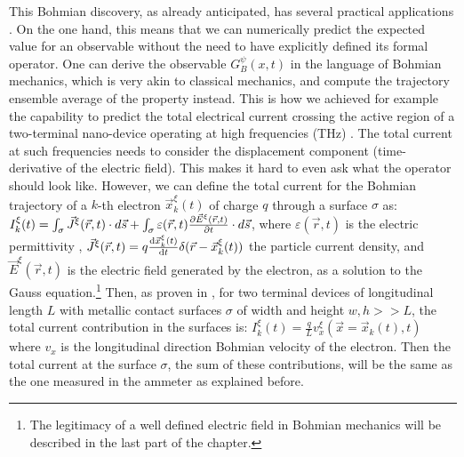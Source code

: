 \documentclass[11pt, a4paper]{article} %
\begin{document}
This Bohmian discovery, as already anticipated, has several practical applications \cite{DevInPosition1, DevInPosition2}. On the one hand, this means that we can numerically predict the expected value for an observable without the need to have explicitly defined its formal operator. One can derive the observable $G^\psi_B(x,t)$ in the language of Bohmian mechanics, which is very akin to classical mechanics, and compute the trajectory ensemble average of the property instead. This is how we achieved for example the capability to predict the total electrical current crossing the active region of a two-terminal nano-device operating at high frequencies (THz) \cite{equiv, Pel}. The total current at such frequencies needs to consider the displacement component (time-derivative of the electric field). This makes it hard to even ask what the operator should look like. However, we can define the total current for the Bohmian trajectory of a $k$-th electron $\vec{x}_k^\xi(t)$ of charge $q$ through a surface $\sigma$ as: $I_k^\xi(t)=\int_\sigma \vec{J}^\xi(\vec{r},t)\cdot d\vec{s}+\int_\sigma \varepsilon(\vec{r},t)\pdv{\vec{E}^\xi(\vec{r},t)}{t}\cdot d\vec{s}$, where $\varepsilon(\vec{r},t)$ is the electric permittivity , $\vec{J}^\xi(\vec{r},t)=q\dv{\vec{x}_k^\xi(t)}{t}\delta(\vec{r}-\vec{x}_k^\xi(t))$ the particle current density, and $\vec{E}^\xi(\vec{r},t)$ is the electric field generated by the electron, as a solution to the Gauss equation.\footnote{The legitimacy of a well defined electric field in Bohmian mechanics will be described in the last part of the chapter.} Then, as proven in \cite{Pel}, for two terminal devices of longitudinal length $L$ with metallic contact surfaces $\sigma$ of width and height $w,h>>L$, the total current contribution in the surfaces is: $I^\xi_k(t)=\frac{q}{L}v_x^\xi(\vec{x}=\vec{x}_k(t), t) $ where $v_x$ is the longitudinal direction Bohmian velocity of the electron. Then the total current at the surface $\sigma$, the sum of these contributions, will be the same as the one measured in the ammeter as explained before. 
\end{document}
